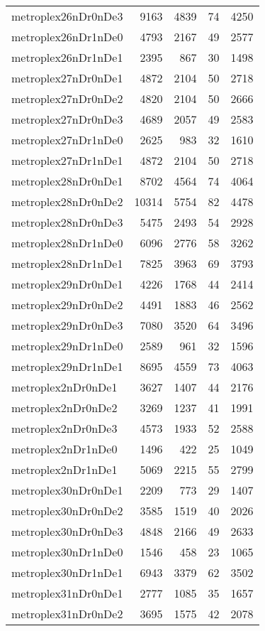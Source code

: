 \documentclass[../../../thesis.tex]{subfiles}
\begin{document}
\begin{longtable}{lrrrr}
metroplex26nDr0nDe3 & 9163 & 4839 & 74 & 4250 \\
metroplex26nDr1nDe0 & 4793 & 2167 & 49 & 2577 \\
metroplex26nDr1nDe1 & 2395 & 867 & 30 & 1498 \\
metroplex27nDr0nDe1 & 4872 & 2104 & 50 & 2718 \\
metroplex27nDr0nDe2 & 4820 & 2104 & 50 & 2666 \\
metroplex27nDr0nDe3 & 4689 & 2057 & 49 & 2583 \\
metroplex27nDr1nDe0 & 2625 & 983 & 32 & 1610 \\
metroplex27nDr1nDe1 & 4872 & 2104 & 50 & 2718 \\
metroplex28nDr0nDe1 & 8702 & 4564 & 74 & 4064 \\
metroplex28nDr0nDe2 & 10314 & 5754 & 82 & 4478 \\
metroplex28nDr0nDe3 & 5475 & 2493 & 54 & 2928 \\
metroplex28nDr1nDe0 & 6096 & 2776 & 58 & 3262 \\
metroplex28nDr1nDe1 & 7825 & 3963 & 69 & 3793 \\
metroplex29nDr0nDe1 & 4226 & 1768 & 44 & 2414 \\
metroplex29nDr0nDe2 & 4491 & 1883 & 46 & 2562 \\
metroplex29nDr0nDe3 & 7080 & 3520 & 64 & 3496 \\
metroplex29nDr1nDe0 & 2589 & 961 & 32 & 1596 \\
metroplex29nDr1nDe1 & 8695 & 4559 & 73 & 4063 \\
metroplex2nDr0nDe1 & 3627 & 1407 & 44 & 2176 \\
metroplex2nDr0nDe2 & 3269 & 1237 & 41 & 1991 \\
metroplex2nDr0nDe3 & 4573 & 1933 & 52 & 2588 \\
metroplex2nDr1nDe0 & 1496 & 422 & 25 & 1049 \\
metroplex2nDr1nDe1 & 5069 & 2215 & 55 & 2799 \\
metroplex30nDr0nDe1 & 2209 & 773 & 29 & 1407 \\
metroplex30nDr0nDe2 & 3585 & 1519 & 40 & 2026 \\
metroplex30nDr0nDe3 & 4848 & 2166 & 49 & 2633 \\
metroplex30nDr1nDe0 & 1546 & 458 & 23 & 1065 \\
metroplex30nDr1nDe1 & 6943 & 3379 & 62 & 3502 \\
metroplex31nDr0nDe1 & 2777 & 1085 & 35 & 1657 \\
metroplex31nDr0nDe2 & 3695 & 1575 & 42 & 2078 \\

\end{longtable}
\end{document}
